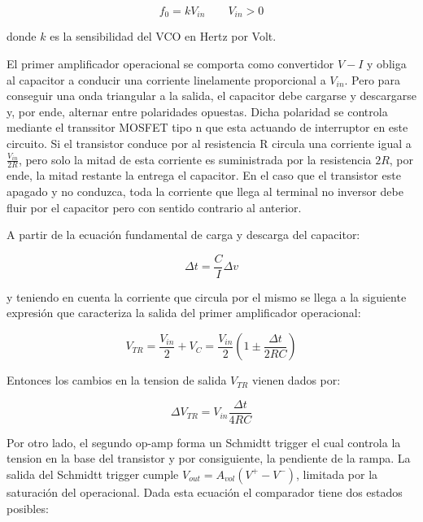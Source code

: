 \begin{equation}
f_0 = kV_{in}  \qquad  V_{in} > 0
\end{equation}

donde $k$ es la sensibilidad del VCO en Hertz por Volt. \newline


El primer amplificador operacional se comporta como convertidor $V-I$ y obliga al capacitor a conducir una corriente linelamente proporcional a $V_{in}$. Pero para conseguir una onda triangular a la salida, el capacitor debe cargarse y descargarse y, por ende, alternar entre polaridades opuestas. Dicha polaridad se controla mediante el transsitor MOSFET tipo n que esta actuando de interruptor en este circuito. Si el transistor conduce por al resistencia R circula una corriente igual a $\frac{V_{in}}{2R}$, pero solo la mitad de esta corriente es suministrada por la resistencia $2R$, por ende, la mitad restante la entrega el capacitor. En el caso que el transistor este apagado y no conduzca, toda la corriente que llega al terminal no inversor debe fluir por el capacitor pero con sentido contrario al anterior. 


A partir de la ecuación fundamental de carga y descarga del capacitor:

\begin{equation}
\Delta t = \frac{C}{I}\Delta v 
\end{equation}

y teniendo en cuenta la corriente que circula por el mismo se llega a la siguiente expresión que caracteriza la salida del primer amplificador operacional:

\begin{equation}\label{eq:rampa}
V_{TR} = \frac{V_{in}}{2} + V_C = \frac{V_{in}}{2}(1 \pm \frac{\Delta t}{2RC})
\end{equation}

Entonces los cambios en la tension de salida $V_{TR}$ vienen dados por:

\begin{equation}
\Delta V_{TR	} = V_{in} \frac{\Delta t}{4RC}
\end{equation}

 

Por otro lado, el segundo op-amp forma un Schmidtt trigger el cual controla la tension en la base del transistor y por consiguiente, la pendiente de la rampa. La salida del Schmidtt trigger cumple $V_{out} = A_{vol}(V^{+} - V^{-})$, limitada por la saturación del operacional. Dada esta ecuación el comparador tiene dos estados posibles:

